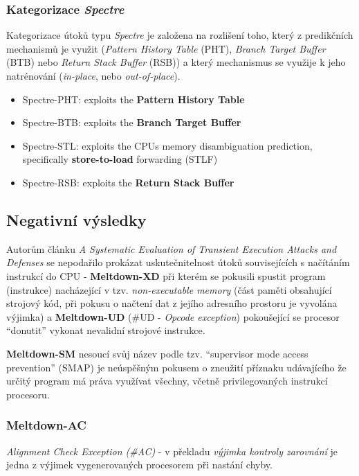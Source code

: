 \subsubsection{Kategorizace \textit{Spectre}}

Kategorizace útoků typu \textit{Spectre} je založena na rozlišení toho, který z predikčních mechanismů je využit (\textit{Pattern History Table} (PHT), \textit{Branch Target Buffer} (BTB) nebo \textit{Return Stack Buffer} (RSB)) a který mechanismus se využije k jeho natrénování (\textit{in-place}, nebo \textit{out-of-place}).

\begin{itemize}
    \item Spectre-PHT: exploits the \textbf{Pattern History Table}
    \item Spectre-BTB: exploits the \textbf{Branch Target Buffer}
    \item Spectre-STL: exploits the CPUs memory disambiguation prediction, specifically \textbf{store-to-load} forwarding (STLF)
    \item Spectre-RSB: exploits the \textbf{Return Stack Buffer}
\end{itemize}

\subsection{Negativní výsledky}

Autorům článku \textit{A Systematic Evaluation of Transient Execution Attacks and Defenses} se nepodařilo prokázat uskutečnitelnost útoků souvisejících s načítáním instrukcí do CPU - \textbf{Meltdown-XD} při kterém se pokusili spustit program (instrukce) nacházející v tzv. \textit{non-executable memory} (část paměti obsahující strojový kód, při pokusu o načtení dat z jejího adresního prostoru je vyvolána výjimka) a \textbf{Meltdown-UD} (\#UD - \textit{Opcode exception}) pokoušející se procesor \enquote{donutit} vykonat nevalidní strojové instrukce.

\textbf{Meltdown-SM} nesoucí svůj název podle tzv. \enquote{supervisor mode access prevention} (SMAP) je neúspěšným pokusem o zneužití příznaku udávajícího že určitý program má práva využívat všechny, včetně privilegovaných instrukcí procesoru.

\subsubsection{Meltdown-AC}

\textit{Alignment Check Exception (\#AC)} - v překladu \textit{výjimka kontroly zarovnání} je jedna z výjimek vygenerovaných procesorem při nastání chyby.

